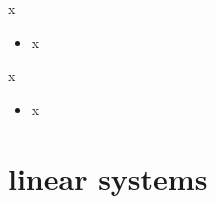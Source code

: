 \documentclass[10pt,hyperref]{beamer}
\begin{document}
\begin{frame}{x}

\begin{itemize}
\item x
\end{itemize}
\end{frame}


\begin{frame}{x}

\begin{itemize}
\item x
\end{itemize}
\end{frame}



\section{linear systems}
\end{document}

